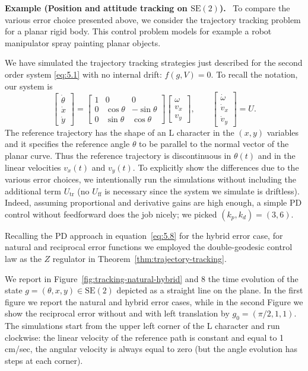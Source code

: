\documentclass[11pt]{article}
\newcommand{\SE}{\mathrm{SE}}
\newcounter{paperexample}
\renewcommand{\thepaperexample}{\arabic{paperexample}}
\newcommand{\paperexample}[2]{\refstepcounter{paperexample}\par\medskip\noindent\textbf{Example \thepaperexample#1.}\label{#2}\ }
\begin{document}
\paperexample{ (Position and attitude tracking on $\SE(2)$)}{ex:se2-tracking} To compare the various error choice presented above, we consider the trajectory tracking problem for a planar rigid body. This control problem models for example a robot manipulator spray painting planar objects.

We have simulated the trajectory tracking strategies just described for the second order system \eqref{eq:5.1} with no internal drift: $f(g,V)=0$. To recall the notation, our system is
\begin{equation*}
\begin{bmatrix}\dot\theta\\\dot x\\\dot y\end{bmatrix}
=\begin{bmatrix}1&0&0\\0&\cos\theta&-\sin\theta\\0&\sin\theta&\cos\theta\end{bmatrix}
\begin{bmatrix}\omega\\v_x\\v_y\end{bmatrix},
\qquad
\begin{bmatrix}\dot\omega\\\dot v_x\\\dot v_y\end{bmatrix}=U.
\end{equation*}
The reference trajectory has the shape of an L character in the $(x,y)$ variables and it specifies the reference angle $\theta$ to be parallel to the normal vector of the planar curve. Thus the reference trajectory is discontinuous in $\theta(t)$ and in the linear velocities $v_x(t)$ and $v_y(t)$. To explicitly show the differences due to the various error choices, we intentionally run the simulations without including the additional term $U_{\mathrm{tr}}$ (no $U_{\mathrm{ff}}$ is necessary since the system we simulate is driftless). Indeed, assuming proportional and derivative gains are high enough, a simple PD control without feedforward does the job nicely; we picked $(k_p,k_d)=(3,6)$.

Recalling the PD approach in equation~\eqref{eq:5.8} for the hybrid error case, for natural and reciprocal error functions we employed the double-geodesic control law as the $Z$ regulator in Theorem~\ref{thm:trajectory-tracking}.

We report in Figure~\ref{fig:tracking-natural-hybrid} and 8 the time evolution of the state $g=(\theta,x,y)\in\SE(2)$ depicted as a straight line on the plane. In the first figure we report the natural and hybrid error cases, while in the second Figure we show the reciprocal error without and with left translation by $g_0=(\pi/2,1,1)$. The simulations start from the upper left corner of the L character and run clockwise: the linear velocity of the reference path is constant and equal to 1 cm/sec, the angular velocity is always equal to zero (but the angle evolution has steps at each corner).
\end{document}

